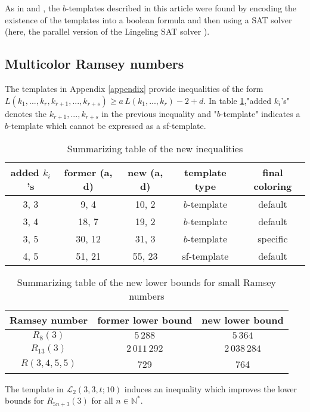 \documentclass{article}
\begin{document}
As in \cite{schurboyz} and \cite{rowleyramseysat}, the \(b\)-templates described in this article were found by encoding 
the existence of the templates into a boolean formula and then using a SAT solver (here, the parallel version of the 
Lingeling SAT solver \cite{Lingeling2017}).

\subsection{Multicolor Ramsey numbers}

The templates in Appendix \ref{appendix} provide inequalities of the form 
\(L(k_1, ..., k_r, k_{r+1}, ..., k_{r+s}) \geqslant a \, L(k_1, ..., k_r) - 2 + d\). In table \ref{tab:ineq},"added 
\(k_i\)'s" denotes the \( k_{r+1}, ..., k_{r+s}\) in the previous inequality and "\(b\)-template" indicates a 
\(b\)-template which cannot be expressed as a sf-template.

\begin{table}[H]
\begin{center}
\caption{Summarizing table of the new inequalities}
\begin{tabular}{| c | c | c | c | c |}
	\hline
	added \(k_i\)'s & former (a, d) & new (a, d) & template type & final coloring \\
	\hline
	3, 3 & 9, 4 \cite{AbbottHanson} & 10, 2 & \(b\)-template & default \\
	\hline
	3, 4 & 18, 7 \cite{rowleyramseysat} & 19, 2 & \(b\)-template & default \\
	\hline
	3, 5 & 30, 12 \cite{rowleyramseysat} & 31, 3 & \(b\)-template & specific \\
	\hline
	4, 5 & 51, 21 \cite{rowleyramseysat} & 55, 23 & sf-template & default \\
	\hline
\end{tabular}
\end{center}
\label{tab:ineq}
\end{table}

\begin{table}[H]
\begin{center}
\caption{Summarizing table of the new lower bounds for small Ramsey numbers}
\begin{tabular}{| c | c | c |}
	\hline
	Ramsey number & former lower bound & new lower bound \\
	\hline
	\(R_8(3)\) & \(5\,288\) \cite{RowleyRamsey} & \(5\,364\)  \\
	\hline
	\(R_{13}(3)\) & \(2\,011\,292\) \cite{schurboyz} & \(2\,038\,284\) \\
	\hline
	\(R(3 , 4 , 5 , 5)\) & 729 \cite{rowleyramseysat} & 764 \\
	\hline
\end{tabular}
\end{center}
\label{tab:bounds}
\end{table}
The template in \(\mathcal{L}_2(3, 3, t; 10)\) induces an inequality which improves the lower bounds for 
\(R_{5 n + 3}(3)\) for all \(n \in \mathbb{N}^*\).
\end{document}
